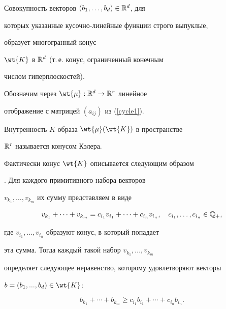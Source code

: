 Совокупность векторов $(b_1,\dotsc,b_d)\in\Bbb{R}^d$, для


которых указанные кусочно-линейные функции строго выпуклые,


образует многогранный конус


$\wt{K}$ в $\Bbb{R}^d$ (т.\,е. конус, ограниченный конечным


числом гиперплоскостей).





Обозначим через $\wt{\mu}:\Bbb{R}^d\to\Bbb{R}^r$ линейное


отображение с матрицей $(a_{ij})$ из (\ref{cycle1}).








\begin{defn}


Внутренность $K$ образа $\wt{\mu}(\wt{K})$ в пространстве


$\Bbb{R}^r$ называется конусом Кэлера.


\end{defn}





Фактически конус $\wt{K}$ описывается следующим образом


\cite{Bat}. Для каждого примитивного набора векторов


$v_{k_1},\dotsc,v_{k_m}$ их сумму представляем в виде


\begin{equation}


v_{k_1}+\dotsb+v_{k_m}=c_{i_1}v_{i_1}+\dotsb+c_{i_n}v_{i_n},\quad


c_{i_1},\dotsc,c_{i_n}\in\Bbb{Q}_+, \label{kelv}


\end{equation}


где $v_{i_1},\dotsc,v_{i_n}$ образуют конус, в который попадает


эта сумма. Тогда каждый такой набор $v_{k_1},...,v_{k_m}$


определяет следующее неравенство, которому удовлетворяют векторы


$b=(b_1,...,b_d)\in\wt{K}$:    %


\begin{equation}


b_{k_1}+\dotsb+b_{k_m}\geqslant


c_{i_1}b_{i_1}+\dotsb+c_{i_n}b_{i_n}. \label{kel0}


\end{equation}



